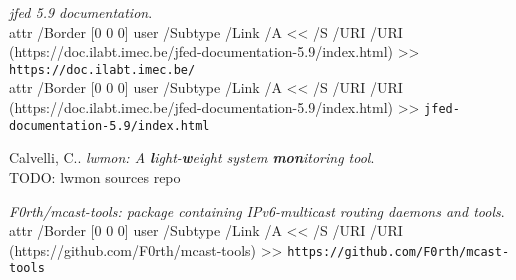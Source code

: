 \documentclass[a4paper,11pt,twocolumn]{article}
\newcommand{\longurl}[2]{%
\pdfstartlink %
attr {/Border [0 0 0]} %
user {/Subtype /Link /A << /S /URI /URI (#1) >>}%
{\footnotesize\tt #2}\pdfendlink}
\newcommand{\url}[1]{\longurl{#1}{#1}}
\newcommand{\url}[1]{{\footnotesize\tt #1}}
\newcommand{\longurl}[2]{{\footnotesize\tt #1}}
\begin{document}
\begin{thebibliography}{99}
  {\em jfed 5.9 documentation}.\\
  \longurl{https://doc.ilabt.imec.be/jfed-documentation-5.9/index.html}%
  {https://doc.ilabt.imec.be/}\\
  \longurl{https://doc.ilabt.imec.be/jfed-documentation-5.9/index.html}%
  {jfed-documentation-5.9/index.html}

  Calvelli, C..
  {\em lwmon: A {\bf\em l}ight-{\bf\em w}eight system {\bf\em mon}itoring tool}.\\
  TODO: lwmon sources repo

  {\em F0rth/mcast-tools: package containing IPv6-multicast
  routing daemons and tools}.\\
  \url{https://github.com/F0rth/mcast-tools}


\end{thebibliography}
\end{document}
